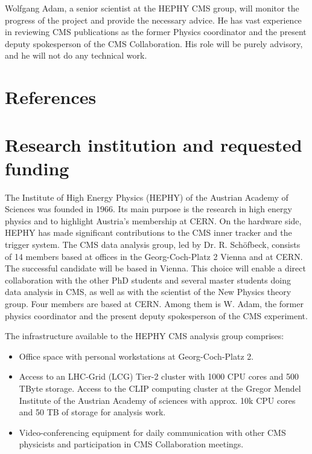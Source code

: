 \documentclass[a4paper,11pt]{article}
\begin{document}
Wolfgang Adam, a senior scientist at the HEPHY CMS group, will monitor the progress of the project and provide the necessary advice. He has vast experience in reviewing CMS publications as the former Physics coordinator and the present deputy spokesperson of the CMS Collaboration. His role will be purely advisory, and he will not do any technical work.

\appendix
\renewcommand{\thesection}{Annex \arabic{section}} 

\clearpage
\section{References}
\renewcommand{\refname}{}
{
%


}

\newpage

\section{Research institution and requested funding}

The Institute of High Energy Physics (HEPHY) of the Austrian Academy of Sciences was founded in 1966. 
Its main purpose is the research in high energy physics and to highlight Austria's membership at CERN. 
On the hardware side, HEPHY has made significant contributions to the CMS inner tracker and the trigger system. 
The CMS data analysis group, led by Dr. R. Sch{\"o}fbeck, consists of 14 members based at offices in the Georg-Coch-Platz 2 Vienna and at CERN. The successful candidate will be based in Vienna. 
This choice will enable a direct collaboration with the other PhD students and several master students doing data analysis in CMS, as well as with the scientist of the New Physics theory group.
Four members are based at CERN. 
Among them is  W. Adam, the former physics coordinator and the present deputy spokesperson of the CMS experiment.

The infrastructure available to the HEPHY CMS analysis group comprises:
\begin{itemize}
\item Office space with personal workstations at Georg-Coch-Platz 2.
\item Access to an LHC-Grid (LCG) Tier-2 cluster with 1000 CPU cores and 500 TByte storage. Access to the CLIP computing cluster at the Gregor Mendel Institute of the Austrian Academy of sciences with approx. 10k CPU cores and 50 TB of
storage for analysis work.
\item Video-conferencing equipment for daily communication with other CMS physicists and participation in CMS Collaboration meetings.
\end{itemize}
\end{document}
